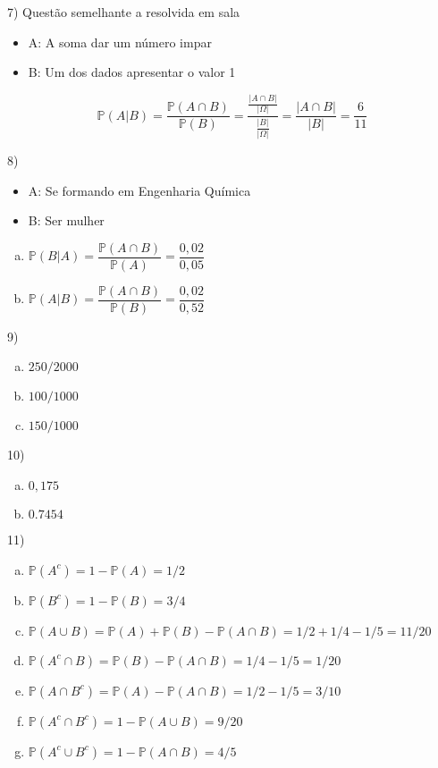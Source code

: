 \documentclass{article}
\begin{document}
 7) Questão semelhante a resolvida em sala
 \begin{itemize}
    \item A: A soma dar um número impar
    \item B: Um dos dados apresentar o valor 1
 \end{itemize}

 $$\mathds{P}(A|B) = \dfrac{\mathds{P}(A \cap B)}{\mathds{P}(B)} = \dfrac{\frac{|A\cap B|}{|\Omega|}}{\frac{|B|}{|\Omega|}} = \dfrac{|A\cap B|}{|B|} = \dfrac{6}{11}$$

8) 
\begin{itemize}
    \item A: Se formando em Engenharia Química
    \item B: Ser mulher
\end{itemize}

\begin{enumerate}[a)]
    \item $\mathds{P}(B|A) = \dfrac{\mathds{P}(A \cap B)}{\mathds{P}(A)} = \dfrac{0,02}{0,05}$
    \item $\mathds{P}(A|B) = \dfrac{\mathds{P}(A \cap B)}{\mathds{P}(B)} = \dfrac{0,02}{0,52}$
\end{enumerate}

9)

\begin{enumerate}[a)]
    \item $250/2000$
    \item $100/1000$
    \item $150/1000$
\end{enumerate}

10) 

\begin{enumerate}[a)]
    \item $0,175$
    \item $0.7454$
\end{enumerate}

11) 

\begin{enumerate}[a)]
    \item $\mathds{P}(A^c) = 1 - \mathds{P}(A) = 1/2$
    \item $\mathds{P}(B^c) = 1 - \mathds{P}(B) = 3/4$
    \item $\mathds{P}(A \cup B) =\mathds{P}(A) + \mathds{P}(B) - \mathds{P}(A \cap B) = 1/2 + 1/4 - 1/5 = 11/20 $
    \item $\mathds{P}(A^c \cap B) = \mathds{P}(B) - \mathds{P}(A \cap B) = 1/4 - 1/5 = 1/20$ 
    \item $\mathds{P}(A \cap B^c) = \mathds{P}(A) - \mathds{P}(A \cap B) = 1/2 - 1/5 = 3/10$ 
    \item $\mathds{P}(A^c \cap B^c) = 1 - \mathds{P}(A \cup B) = 9/20$
    \item $\mathds{P}(A^c \cup B^c) = 1 - \mathds{P}(A \cap B) = 4/5$
\end{enumerate}
\end{document}
